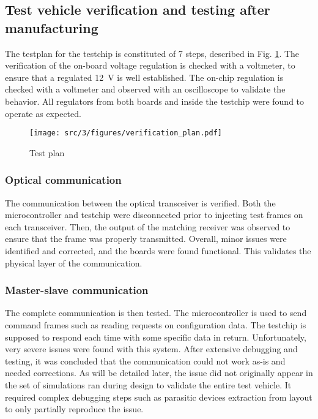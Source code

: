 \subsection{Test vehicle verification and testing after manufacturing}
\label{sec:test-vehicle-testing}

The testplan for the testchip is constituted of 7 steps, described in Fig. \ref{fig:verif-plan}.
The verification of the on-board voltage regulation is checked with a voltmeter, to ensure that a regulated \SI{12}{\volt} is well established.
The on-chip regulation is checked with a voltmeter and observed with an oscilloscope to validate the behavior.
All regulators from both boards and inside the testchip were found to operate as expected.

\begin{figure}[!h]
  \centering
  \texttt{[image: src/3/figures/verification\_plan.pdf]}
  \caption{Test plan}
  \label{fig:verif-plan}
\end{figure}


\subsubsection{Optical communication}

The communication between the optical transceiver is verified.
Both the microcontroller and testchip were disconnected prior to injecting test frames on each transceiver.
Then, the output of the matching receiver was observed to ensure that the frame was properly transmitted.
Overall, minor issues were identified and corrected, and the boards were found functional.
This validates the physical layer of the communication.

\subsubsection{Master-slave communication}

The complete communication is then tested.
The microcontroller is used to send command frames such as reading requests on configuration data.
The testchip is supposed to respond each time with some specific data in return.
Unfortunately, very severe issues were found with this system.
After extensive debugging and testing, it was concluded that the communication could not work as-is and needed corrections.
As will be detailed later, the issue did not originally appear in the set of simulations ran during design to validate the entire test vehicle.
It required complex debugging steps such as parasitic devices extraction from layout to only partially reproduce the issue.

